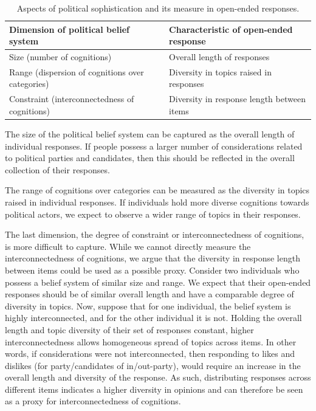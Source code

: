 \documentclass[12pt]{article}
\begin{document}
\begin{table}[h]
\begin{tabular}{ll}
\hline 
Dimension of political belief system & Characteristic of open-ended response \\
\hline
Size (number of cognitions) & Overall length of responses \\
Range (dispersion of cognitions over categories) & Diversity in topics raised in responses \\
Constraint (interconnectedness of cognitions) & Diversity in response length between items \\
\hline
\end{tabular}
\caption{Aspects of political sophistication and its measure in open-ended responses.}\label{tab:measure}
\end{table}

The size of the political belief system can be captured as the overall length of individual responses. If people possess a larger number of considerations related to political parties and candidates, then this should be reflected in the  overall collection of their responses.

The range of cognitions over categories can be measured as the diversity in topics raised in individual responses. If individuals hold more diverse cognitions towards political actors, we expect to observe a wider range of topics in their responses.

The last dimension, the degree of constraint or interconnectedness of cognitions, is more difficult to capture. While we cannot directly measure the interconnectedness of cognitions, we argue that the diversity in response length between items could be used as a possible proxy. Consider two individuals who possess a belief system of similar size and range. We expect that their open-ended responses should be of similar overall length and have a comparable degree of diversity in topics. Now, suppose that for one individual, the belief system is highly interconnected, and for the other individual it is not. Holding the overall length and topic diversity of their set of responses constant, higher interconnectedness allows homogeneous spread of topics across items. In other words, if considerations were not interconnected, then responding to likes and dislikes (for party/candidates of in/out-party), would require an increase in the overall length and diversity of the response. As such, distributing responses across different items indicates a higher diversity in opinions and can therefore be seen as a proxy for interconnectedness of cognitions.
\end{document}

